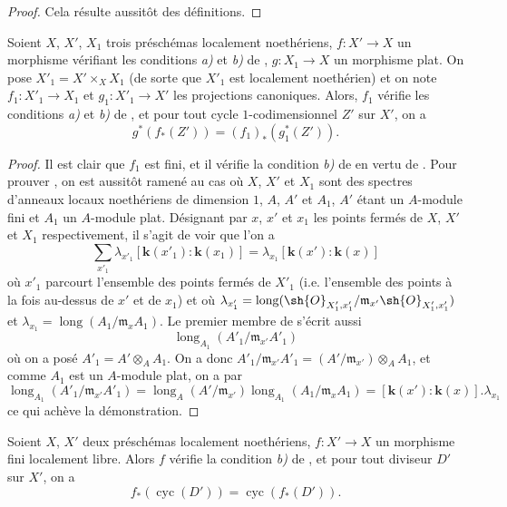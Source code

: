 \begin{proof}
Cela résulte aussitôt des définitions.
\end{proof}

\begin{proposition}[21.10.16]
\label{IV.21.10.16}
Soient $X$, $X'$, $X_1$ trois préschémas localement noethériens, $f:X'\to X$ un morphisme vérifiant les conditions \emph{a)} et \emph{b)} de , $g:X_1\to X$ un morphisme plat.
On pose $X'_1=X'\times_XX_1$ (de sorte que $X'_1$ est localement noethérien) et on note $f_1:X'_1\to X_1$ et $g_1:X'_1\to X'$ les projections canoniques.
Alors, $f_1$ vérifie les conditions \emph{a)} et \emph{b)} de , et pour tout cycle $1$-codimensionnel $Z'$ sur $X'$, on a
\[
\label{IV.21.10.16.1}
  g^*(f_*(Z'))=(f_1)_*(g_1^*(Z')).
  \tag{21.10.16.1}
\]
\end{proposition}

\begin{proof}
Il est clair que $f_1$ est fini, et il vérifie la condition \emph{b)} de  en vertu de .
Pour prouver , on est aussitôt ramené au cas où $X$, $X'$ et $X_1$ sont des spectres d'anneaux locaux noethériens de dimension $1$, $A$, $A'$ et $A_1$, $A'$ étant un $A$-module fini et $A_1$ un $A$-module plat.
Désignant par $x$, $x'$ et $x_1$ les points fermés de $X$, $X'$ et $X_1$ respectivement, il s'agit de voir que l'on a
\[
\label{IV.21.10.16.2}
  \sum_{x'_1}\lambda_{x'_1}[\boldsymbol{k}(x'_1):\boldsymbol{k}(x_1)]
  =\lambda_{x_1}[\boldsymbol{k}(x'):\boldsymbol{k}(x)]
  \tag{21.10.16.2}
\]
où $x'_1$ parcourt l'ensemble des points fermés de $X'_1$ (i.e. l'ensemble des points à la fois au-dessus de $x'$ et de $x_1$) et où $\lambda_{x'_1}=\operatorname{long}(\sh{O}_{X'_1,x'_1}/\mathfrak{m}_{x'}\sh{O}_{X'_1,x'_1})$ et $\lambda_{x_1}=\operatorname{long}(A_1/\mathfrak{m}_xA_1)$.
Le premier membre de  s'écrit aussi
\[
  \operatorname{long}_{A_1}(A'_1/\mathfrak{m}_{x'}A'_1)
\]
où on a posé $A'_1=A'\otimes_AA_1$.
On a donc $A'_1/\mathfrak{m}_{x'}A'_1=(A'/\mathfrak{m}_{x'})\otimes_AA_1$, et comme $A_1$ est un $A$-module plat, on a par 
\[
  \operatorname{long}_{A_1}(A'_1/\mathfrak{m}_{x'}A'_1)
  =\operatorname{long}_{A}(A'/\mathfrak{m}_{x'})\operatorname{long}_{A_1}(A_1/\mathfrak{m}_xA_1)
  =[\boldsymbol{k}(x'): \boldsymbol{k}(x)].\lambda_{x_1}
\]
ce qui achève la démonstration.
\end{proof}

\begin{proposition}[21.10.17]
\label{IV.21.10.17}
Soient $X$, $X'$ deux préschémas localement noethériens, $f:X'\to X$ un morphisme fini localement libre.
Alors $f$ vérifie la condition \emph{b)} de , et pour tout diviseur $D'$ sur $X'$, on a
\[
\label{IV.21.10.17.1}
  f_*(\operatorname{cyc}(D'))=\operatorname{cyc}(f_*(D')).
  \tag{21.10.17.1}
\]
\end{proposition}

